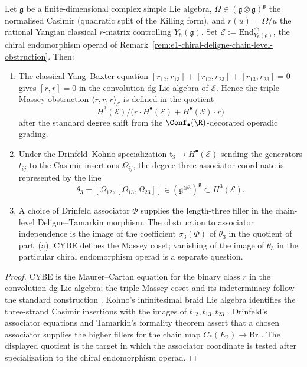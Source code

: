 \begin{proposition}%
\label{prop:massey-rrr-yangian-scope}%
%
%
Let $\mathfrak{g}$ be a finite-dimensional complex simple Lie
algebra, $\Omega\in(\mathfrak{g}\otimes\mathfrak{g})^{\mathfrak{g}}$
the normalised Casimir (quadratic split of the Killing form), and
$r(u)=\Omega/u$ the rational Yangian classical $r$-matrix controlling
$Y_\hbar(\mathfrak{g})$. Set $\mathcal{E}:=\mathrm{End}^{\mathrm{ch}}_{Y_\hbar(\mathfrak{g})}$,
the chiral endomorphism operad of Remark~\ref{rem:e1-chiral-deligne-chain-level-obstruction}.
Then:
\begin{enumerate}
 \item[\textup{(a)}] The classical Yang--Baxter
 equation $[r_{12},r_{13}]+[r_{12},r_{23}]+[r_{13},r_{23}]=0$ gives
 $[r,r]=0$ in the convolution dg Lie algebra of $\mathcal E$.
 Hence the triple Massey obstruction
 $\langle r,r,r\rangle_\mathcal E$ is defined in the quotient
 \[
 H^3(\mathcal E)\Big/
 \bigl(r\cdot H^\bullet(\mathcal E)+H^\bullet(\mathcal E)\cdot r\bigr)
 \]
 after the standard degree shift from the
 $\Conf_\bullet(\R)$-decorated operadic grading.
 \item[\textup{(b)}] Under the Drinfeld--Kohno specialization
 $\mathfrak t_3\to H^\bullet(\mathcal E)$ sending the generators
 $t_{ij}$ to the Casimir insertions $\Omega_{ij}$, the degree-three
 associator coordinate is represented by the line
 \[
 \theta_3=
 [\Omega_{12},[\Omega_{13},\Omega_{23}]]
 \in
 (\mathfrak g^{\otimes 3})^{\mathfrak g}
 \subset H^3(\mathcal E).
 \]
 \item[\textup{(c)}] A choice of Drinfeld associator $\Phi$ supplies
 the length-three filler in the chain-level Deligne--Tamarkin
 morphism. The obstruction to associator independence is the image of
 the coefficient $\sigma_3(\Phi)$ of $\theta_3$ in the quotient of
 part~\textup{(a)}. CYBE defines the Massey coset; vanishing of the image of $\theta_3$ in the particular chiral
 endomorphism operad is a separate question.
 \end{enumerate}
\end{proposition}

\begin{proof}
CYBE is the Maurer--Cartan equation for the binary class $r$ in
the convolution dg Lie algebra; the triple Massey
coset and its indeterminacy follow the standard construction
\cite[Ch.~A.3]{LV12}. Kohno's infinitesimal braid Lie algebra
identifies the three-strand Casimir insertions with the images of
$t_{12},t_{13},t_{23}$ \cite{Kohno1987}. Drinfeld's associator
equations and Tamarkin's formality theorem assert that a
chosen associator supplies the higher fillers for the chain map
$C_\ast(E_2)\to\mathrm{Br}$ \cite{Drinfeld90QuasiHopf,Tamarkin2003}.
The displayed quotient is the target in which the
associator coordinate is tested after specialization to the chiral
endomorphism operad.
\end{proof}

